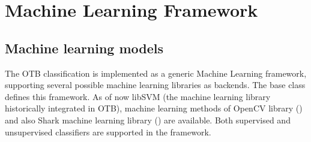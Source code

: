 


\section{Machine Learning Framework}

\subsection{Machine learning models}
\label{sec:MLGenericFramework}

The OTB classification is implemented as a generic Machine Learning
framework, supporting several possible machine learning libraries as backends.
The base class  defines this framework.
As of now libSVM (the machine learning library historically integrated in OTB),
machine learning methods of OpenCV library (\cite{opencv_library}) and also
Shark machine learning library (\cite{shark_library}) are available. Both
supervised and unsupervised classifiers are supported in the framework.

